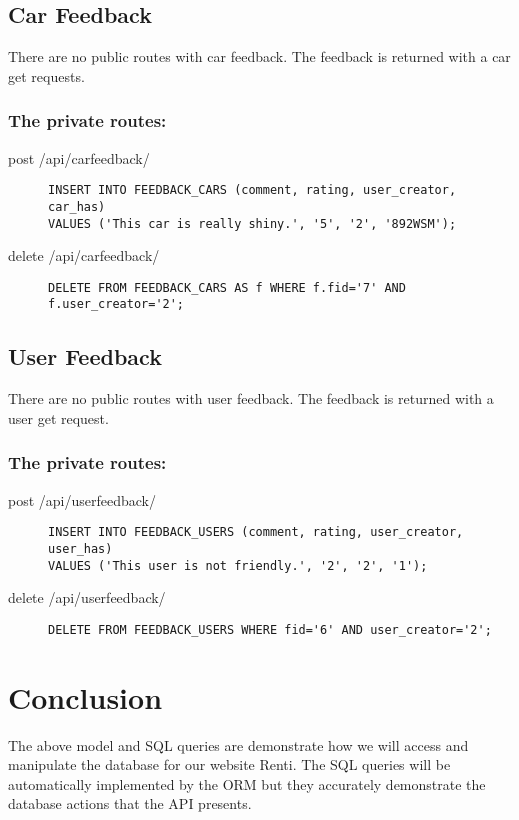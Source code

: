 \documentclass{article}
\begin{document}
\subsection{Car Feedback}
There are no public routes with car feedback. The feedback is returned with a car get requests.

\subsubsection{The private routes:}
\begin{description}
\item[post /api/carfeedback/] \mbox{}
\begin{lstlisting}
INSERT INTO FEEDBACK_CARS (comment, rating, user_creator, car_has)
VALUES ('This car is really shiny.', '5', '2', '892WSM');
\end{lstlisting}
\item[delete /api/carfeedback/] \mbox{}
\begin{lstlisting}
DELETE FROM FEEDBACK_CARS AS f WHERE f.fid='7' AND f.user_creator='2';
\end{lstlisting}
\end{description}

\subsection{User Feedback}
There are no public routes with user feedback. The feedback is returned with a user get request.

\subsubsection{The private routes:}
\begin{description}
\item[post /api/userfeedback/] \mbox{}
\begin{lstlisting}
INSERT INTO FEEDBACK_USERS (comment, rating, user_creator, user_has)
VALUES ('This user is not friendly.', '2', '2', '1');
\end{lstlisting}
\item[delete /api/userfeedback/] \mbox{}
\begin{lstlisting}
DELETE FROM FEEDBACK_USERS WHERE fid='6' AND user_creator='2';
\end{lstlisting}
\end{description}

\section{Conclusion}
The above model and SQL queries are demonstrate how we will access and manipulate the database for our website Renti. The SQL queries will be automatically implemented by the ORM but they accurately demonstrate the database actions that the API presents.
\end{document}
